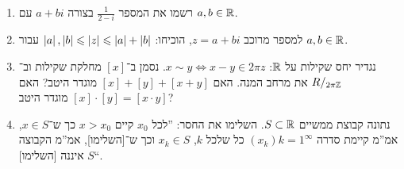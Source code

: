 \documentclass[name=רשימות חדו''א 2א]{../../../tex/classes/noChapterMegasumPreamble}
\begin{document}
	\begin{Exercise}[פתיחה]
		\begin{enumerate}
			\item רשמו את המספר $\frac{1}{2 - i}$ בצורה $a + bi$ עם $a, b \in \mathbb{R}$.
			\item למספר מרוכב $z = a + bi$, הוכיחו: $\left \lvert a \right \rvert, \left \lvert b \right \rvert \leqslant \left \lvert z \right \rvert \leqslant \left \lvert a \right \rvert + \left \lvert b \right \rvert$ עבור $a, b \in \mathbb{R}$.
			\item נגדיר יחס שקילות על $\mathbb{R}$: $x \sim y \iff x - y \in 2 \pi z$. נסמן ב־$[x]$ מחלקת שקילות וב־$R/_{2 \pi \mathbb{Z}}$ את מרחב המנה. האם $[x] + [y] + [x + y]$ מוגדר היטב? האם $[x] \cdot [y] = [x \cdot y]$ מוגדר היטב?
			\item נתונה קבוצת ממשיים $S \subset \mathbb{R}$. השלימו את החסר: ''לכל $x_0$ קיים $x > x_0$ כך ש־$x \in S$, אמ''מ קיימת סדרה $(x_k){k = 1}^{\infty}$ כל שלכל $k$, $x_k \in S$ וכך ש־[השלימו], אמ''מ הקבוצה $S$ איננה [השלימו]``.
		\end{enumerate}
	\end{Exercise}
\end{document}
